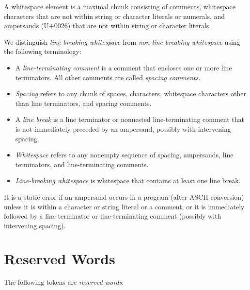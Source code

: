 A whitespace element is a maximal chunk
consisting of comments,
whitespace characters
that are not within string or character literals
or numerals, and ampersands (U+0026)
that are not within string or character literals.

We distinguish \emph{line-breaking whitespace}
from \emph{non-line-breaking whitespace}
using the following terminology:
\begin{itemize}

\item
A \emph{line-terminating comment}
is a comment that encloses one or more line terminators.
All other comments are called \emph{spacing comments}.

\item
\emph{Spacing}
refers to any chunk of spaces,
 characters,
whitespace characters other than line terminators,
and spacing comments.

\item
A \emph{line break} is a line terminator
or nonnested line-terminating comment
that is not immediately preceded by an ampersand,
possibly with intervening spacing.

\item
\emph{Whitespace} refers to any nonempty sequence of spacing,
ampersands,
line terminators, and line-terminating comments.

\item \emph{Line-breaking whitespace} is whitespace that
contains at least one line break.
\end{itemize}

It is a static error if an ampersand occurs in a program
(after ASCII conversion) unless
it is within a character or string literal or a comment,
or it is immediately followed by a line terminator
or line-terminating comment
(possibly with intervening spacing).

\section{Reserved Words}

The following tokens are \emph{reserved words}:\\



